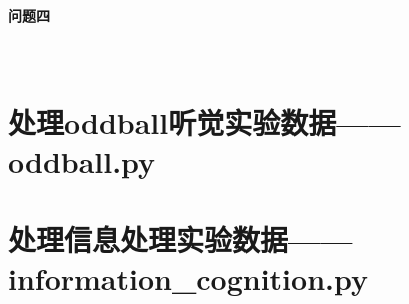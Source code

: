 \documentclass{hitreport}
\begin{document}
\paragraph{问题四}~{}


\newpage

\renewcommand\refname{参考文献}
 
 

\newpage
\begin{appendices}

\section{处理oddball听觉实验数据——oddball.py}\label{app:oddball}



\section{处理信息处理实验数据——information\_cognition.py}\label{app:information}


%
%
%
%
%
%

\end{appendices}
\end{document}
